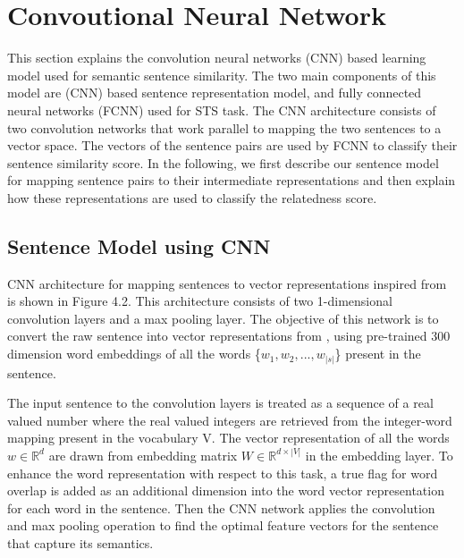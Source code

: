 \documentclass[12pt]{report} %
\begin{document}
\section{Convoutional Neural Network}
	This section explains the convolution neural networks (CNN) based learning model used for semantic sentence similarity. The two main components of this model are (CNN) based sentence representation model, and fully connected neural networks (FCNN) used for STS task. The CNN architecture consists of two convolution networks that work parallel to mapping the two sentences to a vector space. The vectors of the sentence pairs are used by FCNN to classify their sentence similarity score. In the following, we first describe our sentence model for mapping sentence pairs to their intermediate representations and then explain how these representations are used to classify the relatedness score.
	
	\subsection{Sentence Model using CNN}
	CNN architecture for mapping sentences to
	vector representations inspired from \cite{shao2017hcti} is shown in Figure 4.2. This architecture consists of two 1-dimensional convolution layers and a max pooling layer. The objective of this network is to convert the raw sentence into vector representations from \cite{pennington2014glove}, using pre-trained 300 dimension word embeddings of all the words \{$w_{1}, w_{2},...,w_{|s|}$\} present in the sentence.
	
	The input sentence to the convolution layers is treated as a sequence of a real valued number where the real valued integers are retrieved from the integer-word mapping present in the vocabulary V. The vector representation of all the words $ w \in \mathbb{R}^{d}  $ are drawn from embedding matrix  $ W \in \mathbb{R}^{d \times |V|} $ in the embedding layer. To enhance the word representation with respect to this task, a true flag for word overlap is added as an additional dimension into the word vector representation for each word in the sentence. Then the CNN network applies the convolution and max pooling operation to find the optimal feature vectors for the sentence that capture its semantics. 
	
\end{document}
